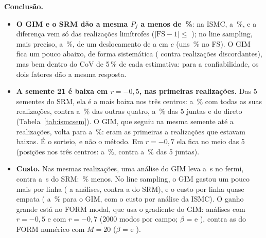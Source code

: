 \documentclass[11pt,a4paper]{article}
\begin{document}
\textbf{Conclusão.}
\begin{itemize}
  \item \textbf{O GIM e o SRM dão a mesma $P_f$ a menos de \sgDifAbsMax\,\%}: na ISMC, \sgDifMin{} a \sgDifMax\,\%, e a
    diferença vem só das realizações limítrofes ($|\mathrm{FS} - 1| \le$ \sgDiscFS); no line sampling, mais preciso,
    \sglDifMin{} a \sglDifMax\,\%, de um deslocamento de \sglDcMin{} a \sglDcMax{} em $c$ (uns \sglDfs\,\% no FS). O
    GIM fica um pouco abaixo, de forma sistemática (\sgDistSrm{} contra \sgDistGim{} realizações discordantes), mas
    bem dentro do CoV de 5\,\% de cada estimativa: para a confiabilidade, os dois fatores dão a mesma resposta.
  \item \textbf{A semente 21 é baixa em $r = -0{,}5$, nas primeiras realizações.} Das 5 sementes do SRM, ela é a mais
    baixa nos três centros: \sUmRaMin{} a \sUmRaMax\,\% com todas as suas realizações, contra \sOutRaMin{} a
    \sOutRaMax\,\% das outras quatro, \sJunRaMin{} a \sJunRaMax\,\% das 5 juntas e  do direto
    (Tabela~\ref{tab:ismcsem}). O GIM, que seguiu na mesma semente até \sgGaNmin{} a \sgGaNmax{} realizações, volta para
    \sgGaRaMin{} a \sgGaRaMax\,\%: eram as primeiras \sgNRaMin{} a \sgNRaMax{} realizações que estavam baixas. É o sorteio, e não o
    método. Em $r = -0{,}7$ ela fica no meio das 5 (posições \sPosRb{} nos três centros: \sUmRbMin{} a
    \sUmRbMax\,\%, contra \sJunRbMin{} a \sJunRbMax\,\% das 5 juntas).
  \item \textbf{Custo.} Nas mesmas realizações, uma análise do GIM leva \sgTgimMin{} a \sgTgimMax\,s no fermi, contra
    \sgTsrmMin{} a \sgTsrmMax\,s do SRM: \sgEcon\,\% menos. No line sampling, o GIM gastou um pouco mais por linha
    (\sglNaGimMin{} a \sglNaGimMax{} análises, contra \sglNaSrmMin{} a \sglNaSrmMax{} do SRM), e o custo por linha
    quase empata (\sglCustoMin{} a \sglCustoMax\,\% para o GIM, com o custo por análise da ISMC). O ganho grande está
    no FORM modal, que usa o gradiente do GIM: \fgNRa{} análises com $r = -0{,}5$ e \fgNRb{} com $r = -0{,}7$ (2000
    modos por campo; $\beta$ = \fgBetaRa{} e \fgBetaRb), contra as \fnNRa{} do FORM numérico com $M = 20$ ($\beta$ =
    \fnBetaRa{} e \fnBetaRb).
\end{itemize}
\end{document}
